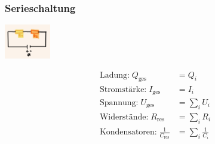 \subsubsection*{Serieschaltung}
\vspace{-1mm}
\begin{minipage}{0.39\linewidth}
    \begin{footnotesize}
        \begin{center}
            \vspace{2mm}
            \includegraphics[width = 20mm]{src/images/serieschaltung.png}
        \end{center}
    \end{footnotesize}
\end{minipage}
\begin{minipage}{0.6\linewidth}
    \begin{scriptsize}
        \begin{center}
            \begin{align*}
                \text{Ladung:} \; Q_{\text{ges}} &= Q_i\\
                \text{Stromstärke:} \; I_{\text{ges}} &= I_i\\
                \text{Spannung:} \; U_{\text{ges}} &= \sum\limits_i U_i\\
                \text{Widerstände:} \; R_{\text{res}} &= \sum\limits_i R_i\\
                \text{Kondensatoren:} \; \frac{1}{C_{\text{res}}} &= \sum\limits_i \frac{1}{C_i}
            \end{align*}
        \end{center}
    \end{scriptsize}
\end{minipage}
\vspace{1mm}

